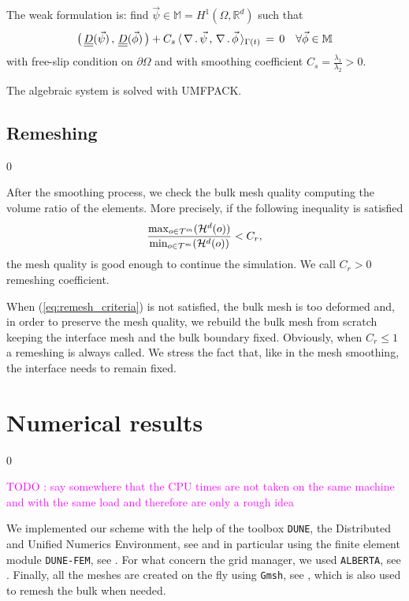 \documentclass[a4paper,12pt,onecolumn]{article}
\newcommand{\R}{{\mathbb R}}
\newcommand{\sigmaO}{o}
\newcommand{\mat}[1]{\underline{\underline{#1}}\rule{0pt}{0pt}}
\begin{document}
The weak formulation is: find $\vec\psi\in \mathbb{M}= H^1(\Omega, \R^d)$ such that
\begin{equation}
 \big(\,\mat D(\vec\psi)\,,\,\mat D (\vec \phi)\,\big)+ C_s\,\langle\, \nabla\,.\,\vec \psi\,,\,\nabla\,.\,\vec\phi\,\rangle_{\Gamma(t)}\, 
 =\, 0\quad \forall \vec \phi \in\mathbb{M}
\end{equation}
with free-slip condition on $\partial\Omega$ and with smoothing coefficient $C_s=\frac{\lambda_1}{\lambda_2}>0$.

The algebraic system is solved with UMFPACK.

\subsection{Remeshing} \label{subsec:remeshing}
\setcounter{equation} 0

After the smoothing process, we check the bulk mesh quality computing the volume ratio of the elements. More precisely, if the following inequality is satisfied
\begin{equation}\label{eq:remesh_criteria}
\frac{\max_{\sigmaO\in {\cal T}^m}(\mathcal{H}^{d}(\sigmaO))}{\min_{\sigmaO\in\mathcal {T}^m}(\mathcal{H}^{d}(\sigmaO))}<C_r,
\end{equation}
the mesh quality is good enough to continue the simulation. We call $C_r>0$ remeshing coefficient. 

When (\ref{eq:remesh_criteria}) is not satisfied, the bulk mesh is too deformed and, in order to preserve the mesh quality, we rebuild the bulk mesh from scratch keeping the interface mesh and the bulk boundary fixed. Obviously, when $C_r\leq 1$ a remeshing is always called. We stress the fact that, like in the mesh smoothing, the interface needs to remain fixed.

\section{Numerical results} \label{sec:numerical_results}
\setcounter{equation} 0

\textcolor{magenta}{TODO : say somewhere that the CPU times are not taken on the same machine and with the same load and therefore are only a rough idea}

We implemented our scheme with the help of the toolbox \verb|DUNE|, the Distributed and Unified Numerics Environment, see \cite{ISTL,ISTLParallel,dunegridpaperI08,dunegridpaperII08,dune-web-page} and in particular using the finite element module \verb|DUNE-FEM|, see \cite{dunefempaper10,dunefem-web-page}. For what concern the grid manager, we used \verb|ALBERTA|, see \cite{Alberta,alberta-web-page}. Finally, all the meshes are created on the fly using \verb|Gmsh|, see \cite{GeuzaineR09,gmsh-web-page}, which is also used to remesh the bulk when needed.
\end{document}
